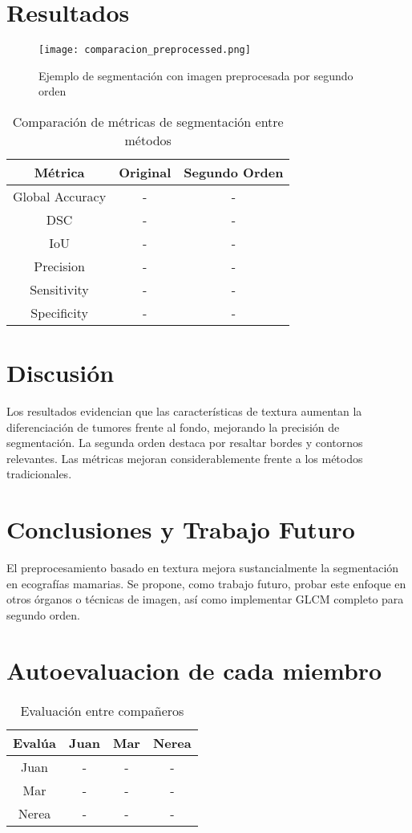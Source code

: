 \documentclass[12pt]{article}
\begin{document}
\section{Resultados}
\begin{figure}[H]
\centering
\texttt{[image: comparacion\_preprocessed.png]}
\caption{Ejemplo de segmentación con imagen preprocesada por segundo orden}
\end{figure}

\begin{table}[H]
\centering
\begin{tabular}{|c|c|c|}
\hline
\textbf{Métrica} & \textbf{Original} & \textbf{Segundo Orden} \\
\hline
Global Accuracy & - & - \\
DSC & - & - \\
IoU & - & - \\
Precision & - & - \\
Sensitivity & - & - \\
Specificity & - & - \\
\hline
\end{tabular}
\caption{Comparación de métricas de segmentación entre métodos}
\end{table}

\section{Discusión}
Los resultados evidencian que las características de textura aumentan la diferenciación de tumores frente al fondo, mejorando la precisión de segmentación. La segunda orden destaca por resaltar bordes y contornos relevantes. Las métricas mejoran considerablemente frente a los métodos tradicionales.

\section{Conclusiones y Trabajo Futuro}
El preprocesamiento basado en textura mejora sustancialmente la segmentación en ecografías mamarias. Se propone, como trabajo futuro, probar este enfoque en otros órganos o técnicas de imagen, así como implementar GLCM completo para segundo orden.

\section{Autoevaluacion de cada miembro}

\begin{table}[H]
\centering
\begin{tabular}{|c|c|c|c|}
\hline
\textbf{Evalúa} & \textbf{Juan} & \textbf{Mar} & \textbf{Nerea} \\
\hline
Juan & - & - & - \\
Mar & - & - & - \\
Nerea & - & - & - \\
\hline
\end{tabular}
\caption{Evaluación entre compañeros}
\end{table}
\end{document}
